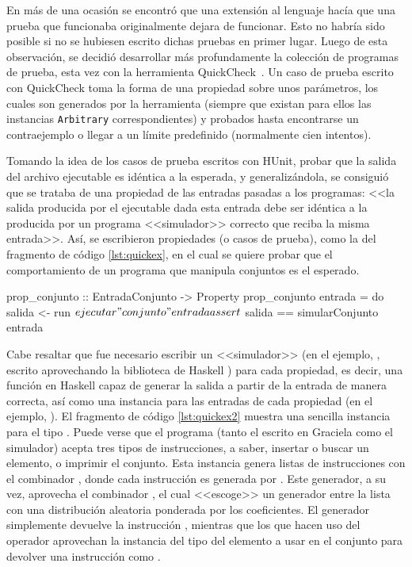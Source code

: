 {{En más de una ocasión se encontró que una extensión al lenguaje hacía que una
prueba que funcionaba originalmente dejara de funcionar. Esto no habría sido
posible si no se hubiesen escrito dichas pruebas en primer lugar. Luego de esta
observación, se decidió desarrollar más profundamente la colección de programas
de prueba, esta vez con la herramienta QuickCheck~\cite{quickcheck}. Un caso de
prueba escrito con QuickCheck toma la forma de una propiedad sobre unos
parámetros, los cuales son generados por la herramienta (siempre que existan
para ellos las instancias \texttt{Arbitrary} correspondientes) y probados hasta
encontrarse un contraejemplo o llegar a un límite predefinido (normalmente cien
intentos).

Tomando la idea de los casos de prueba escritos con HUnit, probar que la salida
del archivo ejecutable es idéntica a la esperada, y generalizándola, se
consiguió que se trataba de una propiedad de las entradas pasadas a los
programas: <<la salida producida por el ejecutable dada esta entrada debe ser
idéntica a la producida por un programa <<simulador>> correcto que reciba la
misma entrada>>. Así, se escribieron propiedades (o casos de prueba), como la
del fragmento de código \ref{lst:quickex}, en el cual se quiere probar que el
comportamiento de un programa que manipula conjuntos es el esperado. 

\begin{haskellcode}[caption=Ejemplo de uso de QuickCheck, label=lst:quickex]
prop_conjunto :: EntradaConjunto -> Property
prop_conjunto entrada = do
  salida <- run $ ejecutar "conjunto" entrada
  assert $ salida == simularConjunto entrada
\end{haskellcode}

Cabe resaltar que fue necesario escribir un <<simulador>> (en el ejemplo,
, escrito aprovechando la biblioteca de Haskell
) para cada propiedad, es decir, una función en Haskell capaz de
generar la salida a partir de la entrada de manera correcta, así como una
instancia  para las entradas de cada propiedad (en el ejemplo,
). El fragmento de código \ref{lst:quickex2} muestra una
sencilla instancia  para el tipo . Puede
verse que el programa (tanto el escrito en Graciela como el simulador) acepta
tres tipos de instrucciones, a saber, insertar o buscar un elemento,
o imprimir el conjunto. Esta instancia  genera listas de  instrucciones con
el combinador , donde cada instrucción es generada por
. Este generador, a su vez, aprovecha el combinador , el cual <<escoge>> un
generador entre la lista con una distribución aleatoria ponderada por los coeficientes. El generador  simplemente devuelve la instrucción ,
mientras que los que hacen uso del operador \inhas{<$>} aprovechan la instancia
 del tipo del elemento a usar en el conjunto para devolver una instrucción como .

}}
